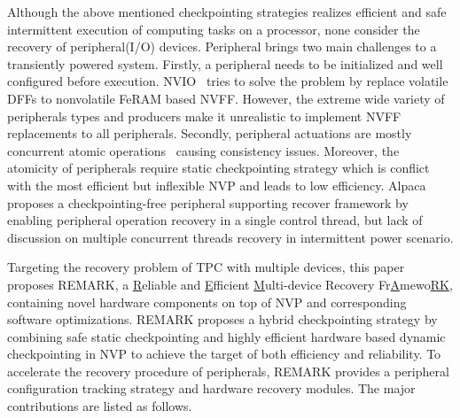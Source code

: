 Although the above mentioned checkpointing strategies realizes efficient and safe intermittent execution of computing tasks on a processor, none consider the recovery of peripheral(I/O) devices.
Peripheral brings two main challenges to a transiently powered system.
Firstly, a peripheral needs to be initialized and well configured before execution. 
NVIO~\cite{li2016hw} tries to solve the problem by replace volatile DFFs to nonvolatile FeRAM based NVFF. 
However, the extreme wide variety of peripherals types and producers make it unrealistic to implement NVFF replacements to all peripherals. 
Secondly, peripheral actuations are mostly concurrent atomic operations~\cite{LuciaSurvey} causing consistency issues.
Moreover, the atomicity of peripherals require static checkpointing strategy which is conflict with the most efficient but inflexible NVP and leads to low efficiency.
Alpaca~\cite{lucia2017Alpaca} proposes a checkpointing-free peripheral supporting recover framework by enabling peripheral operation recovery in a single control thread, but lack of discussion on multiple concurrent threads recovery in intermittent power scenario.

Targeting the recovery problem of TPC with multiple devices, this paper proposes REMARK, a \underline{R}eliable and \underline{E}fficient \underline{M}ulti-device Recovery Fr\underline{A}mewo\underline{RK}, containing novel hardware components on top of NVP and corresponding software optimizations.
REMARK proposes a hybrid checkpointing strategy by combining safe static checkpointing and highly efficient hardware based dynamic checkpointing in NVP to achieve the target of both efficiency and reliability.
To accelerate the recovery procedure of peripherals, REMARK provides a peripheral configuration tracking strategy and hardware recovery modules.
The major contributions are listed as follows.

